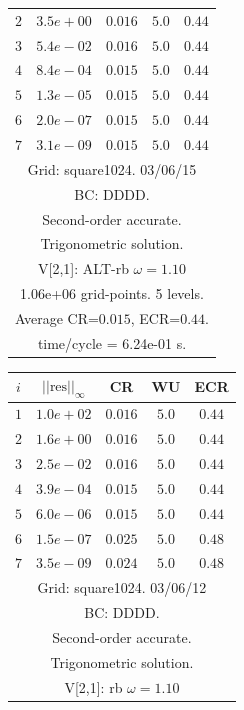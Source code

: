 \begin{table}[hbt]
\begin{center}
{\begin{tabular}{|c|c|c|c|c|}
 $ 2$  & $ 3.5e+00$ & $0.016$ & $ 5.0$ & $0.44$ \\ 
 $ 3$  & $ 5.4e-02$ & $0.016$ & $ 5.0$ & $0.44$ \\ 
 $ 4$  & $ 8.4e-04$ & $0.015$ & $ 5.0$ & $0.44$ \\ 
 $ 5$  & $ 1.3e-05$ & $0.015$ & $ 5.0$ & $0.44$ \\ 
 $ 6$  & $ 2.0e-07$ & $0.015$ & $ 5.0$ & $0.44$ \\ 
 $ 7$  & $ 3.1e-09$ & $0.015$ & $ 5.0$ & $0.44$ \\ 
\hline 
\multicolumn{5}{|c|}{Grid: square1024. 03/06/15}  \\
\multicolumn{5}{|c|}{BC: DDDD.}  \\
\multicolumn{5}{|c|}{Second-order accurate.}  \\
\multicolumn{5}{|c|}{Trigonometric solution.}  \\
\multicolumn{5}{|c|}{V[2,1]: ALT-rb $\omega=1.10$}  \\
\multicolumn{5}{|c|}{1.06e+06 grid-points. 5 levels.}  \\
\multicolumn{5}{|c|}{Average CR=$0.015$, ECR=$0.44$.}  \\
\multicolumn{5}{|c|}{time/cycle = 6.24e-01 s.}  \\
\hline 
\end{tabular}
\begin{tabular}{|c|c|c|c|c|} \hline 
 $i$   & $\vert\vert\mbox{res}\vert\vert_\infty$  &  CR     &  WU    & ECR  \\   \hline 
 $ 1$  & $ 1.0e+02$ & $0.016$ & $ 5.0$ & $0.44$ \\ 
 $ 2$  & $ 1.6e+00$ & $0.016$ & $ 5.0$ & $0.44$ \\ 
 $ 3$  & $ 2.5e-02$ & $0.016$ & $ 5.0$ & $0.44$ \\ 
 $ 4$  & $ 3.9e-04$ & $0.015$ & $ 5.0$ & $0.44$ \\ 
 $ 5$  & $ 6.0e-06$ & $0.015$ & $ 5.0$ & $0.44$ \\ 
 $ 6$  & $ 1.5e-07$ & $0.025$ & $ 5.0$ & $0.48$ \\ 
 $ 7$  & $ 3.5e-09$ & $0.024$ & $ 5.0$ & $0.48$ \\ 
\hline 
\multicolumn{5}{|c|}{Grid: square1024. 03/06/12}  \\
\multicolumn{5}{|c|}{BC: DDDD.}  \\
\multicolumn{5}{|c|}{Second-order accurate.}  \\
\multicolumn{5}{|c|}{Trigonometric solution.}  \\
\multicolumn{5}{|c|}{V[2,1]: rb $\omega=1.10$}  \\

\end{tabular}}
\end{center}
\end{table}
